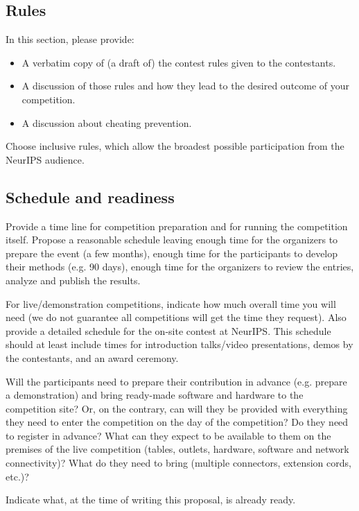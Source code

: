 \documentclass[11pt, oneside]{article}
\begin{document}
\subsection{Rules}

In this section, please provide:

\begin{itemize}
	\item A verbatim copy of (a draft of) the contest rules given to the contestants.
	\item A discussion of those rules and how they lead to the desired outcome of your competition.
	\item A discussion about cheating prevention.
\end{itemize}

Choose inclusive rules, which allow the broadest possible participation from the NeurIPS audience.

\subsection{Schedule and readiness}

Provide a time line for competition preparation and for running the competition itself. Propose a reasonable schedule leaving enough time for the organizers
to prepare the event (a few months), enough time for the participants to develop their methods (e.g. 90 days), enough time for the organizers to review the entries, analyze and publish the results.

For live/demonstration competitions, indicate how much overall time you will need (we do not guarantee all competitions will get the time they request). Also provide a detailed schedule for the on-site contest at NeurIPS. This schedule should at least include times for introduction talks/video presentations, demos by the contestants, and an award ceremony.

 Will the participants need to prepare their contribution in advance (e.g. prepare a demonstration) and bring ready-made software and hardware to the competition site? Or, on the contrary, can will they be provided with everything they need to enter the competition on the day of the competition? Do they need to register in advance? What can they expect to be available to them on the premises of the live competition (tables, outlets, hardware, software and network connectivity)? What do they need to bring (multiple connectors, extension cords, etc.)?


Indicate what, at the time of writing this proposal, is already ready.
\end{document}

